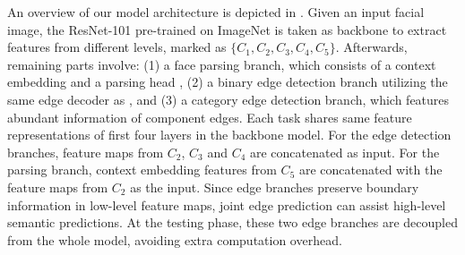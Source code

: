 \documentclass[10pt,twocolumn,letterpaper]{article}
\begin{document}
An overview of our model architecture is depicted in \figureautorefname{ \ref{fig:framwork}}. Given an input facial image, the ResNet-101 \cite{resnet101} pre-trained on ImageNet is taken as backbone to extract features from different levels, marked as $\{C_1, C_2, C_3, C_4, C_5\}$. Afterwards, remaining parts involve: (1) a face parsing branch, which consists of a context embedding and a parsing head \cite{te2020edge}, (2) a binary edge detection branch utilizing the same edge decoder as \cite{ce2p}, and (3) a category edge detection branch, which features abundant information of component edges. Each task shares same feature representations of first four layers in the backbone model. For the edge detection branches, feature maps from $C_2$, $C_3$ and $C_4$ are concatenated as input. For the parsing branch, context embedding features from $C_5$ are concatenated with the feature maps from $C_2$ as the input.
Since edge branches preserve boundary information in low-level feature maps, joint edge prediction can assist high-level semantic predictions. At the testing phase, these two edge branches are decoupled from the whole model, avoiding extra computation overhead.
\end{document}
